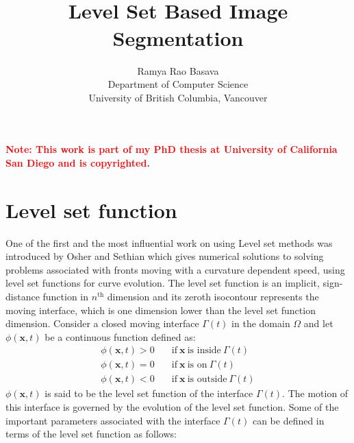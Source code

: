 \documentclass[10pt,letterpaper, onecolumn]{article}
\title{\vspace{-3cm}
\noindent\makebox[\linewidth]{\rule{0.8\textwidth}{2.0pt}} \\ 
\textbf{Level Set Based Image Segmentation} \\
\vspace{-0.30cm}
\noindent\makebox[\linewidth]{\rule{0.8\textwidth}{0.5pt}}}
\author{Ramya Rao Basava\\
Department of Computer Science\\
University of British Columbia, Vancouver}
\date{}
\begin{document}
\maketitle

\textcolor{red}{\textbf{Note: This work is part of my PhD thesis at University of California San Diego and is copyrighted.}}

\section{Level set function}
One of the first and the most influential work on using Level set methods was introduced by Osher and Sethian \cite{osher1988fronts} which gives numerical solutions to solving problems associated with fronts moving with a curvature dependent speed, using level set functions for curve evolution. The level set function is an implicit, sign-distance function in $n^{\text{th}}$ dimension and its zeroth isocontour represents the moving interface, which is one dimension lower than the level set function dimension. Consider a closed moving interface $\Gamma(t)$ in the domain $\Omega$ and let $\phi(\bm{x},t)$ be a continuous function defined as: 
%
\begin{subequations}
\begin{align}
\phi(\bm{x},t)>0 \quad & \text{if}\  \bm{x} \ \text{is inside} \ \Gamma(t) \\ 
\phi(\bm{x},t)=0 \quad & \text{if}\  \bm{x} \ \text{is on} \ \Gamma(t) \\
\phi(\bm{x},t)<0 \quad & \text{if}\  \bm{x} \ \text{is outside} \ \Gamma(t) 
\end{align}
\label{eqn3.1}
\end{subequations}
%
$\phi(\bm{x},t)$ is said to be the level set function of the interface $\Gamma(t)$. 
The motion of this interface is governed by the evolution of the level set function. Some of the important parameters associated with the interface $\Gamma(t)$ can be defined in terms of the level set function as follows:
\end{document}
